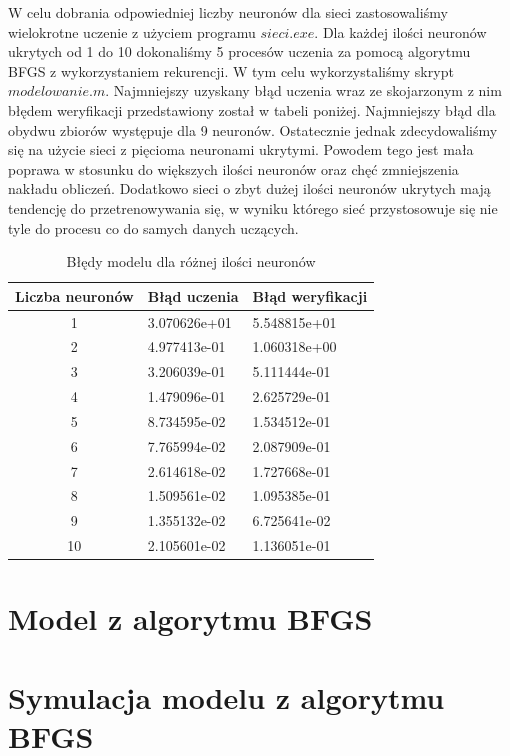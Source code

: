 		W celu dobrania odpowiedniej liczby neuronów dla sieci zastosowaliśmy wielokrotne uczenie z użyciem programu $sieci.exe$. Dla każdej ilości neuronów ukrytych od 1 do 10 dokonaliśmy 5 procesów uczenia za pomocą algorytmu BFGS z wykorzystaniem rekurencji. W tym celu wykorzystaliśmy skrypt $modelowanie.m$. Najmniejszy uzyskany błąd uczenia wraz ze skojarzonym z nim błędem weryfikacji przedstawiony został w tabeli poniżej. Najmniejszy błąd dla obydwu zbiorów występuje dla 9 neuronów. Ostatecznie jednak zdecydowaliśmy się na użycie sieci z pięcioma neuronami ukrytymi. Powodem tego jest mała poprawa w stosunku do większych ilości neuronów oraz chęć zmniejszenia nakładu obliczeń. Dodatkowo sieci o zbyt dużej ilości neuronów ukrytych mają tendencję do przetrenowywania się, w wyniku którego sieć przystosowuje się nie tyle do procesu co do samych danych uczących.
		
		\begin{table}[h!]
			\centering
			\begin{tabular}{c|l|l}
				Liczba neuronów&Błąd uczenia&Błąd weryfikacji\\\hline
				1&3.070626e+01&5.548815e+01\\\hline
				2&4.977413e-01&1.060318e+00\\\hline
				3&3.206039e-01&5.111444e-01\\\hline
				4&1.479096e-01&2.625729e-01\\\hline
				5&8.734595e-02&1.534512e-01\\\hline
				6&7.765994e-02&2.087909e-01\\\hline
				7&2.614618e-02&1.727668e-01\\\hline
				8&1.509561e-02&1.095385e-01\\\hline
				9&1.355132e-02&6.725641e-02\\\hline
				10&2.105601e-02&1.136051e-01\\\hline
			\end{tabular}
		\caption{Błędy modelu dla różnej ilości neuronów}
		\label{tab:neurony}
		\end{table}
		
	\section{Model z algorytmu BFGS}
		\label{sec:bfgs}
		
	\section{Symulacja modelu z algorytmu BFGS}
		\label{sec:bfgs_sym}
		
